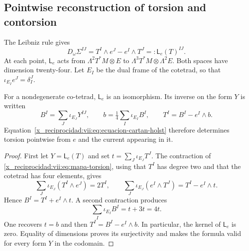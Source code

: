 \begin{HMTCompactSection}
\section{Pointwise reconstruction of torsion and contorsion}
\label{x_reciprocidad:vii:subsec:reconstruccion-torsion}

The Leibniz rule gives
\begin{equation}
 D_\omega\Sigma^{IJ}
 =T^I\wedge e^J-e^I\wedge T^J
 =:\mathsf L_e(T)^{IJ}.
 \label{x_reciprocidad:vii:eq:mapa-torsion}
\end{equation}
At each point, \(\mathsf L_e\) acts from \(\Lambda^2T^*M\otimes E\) to \(\Lambda^3T^*M\otimes\Lambda^2E\). Both spaces have dimension twenty-four. Let \(E_I\) be the dual frame of the cotetrad, so that \(\iota_{E_I}e^J=\delta_I^J\).

\begin{theorem}
\label{x_reciprocidad:vii:thm:inversion-torsion}
For a nondegenerate co-tetrad, \(\mathsf L_e\) is an isomorphism.
Its inverse on the form \(Y\) is written
\begin{equation}
 B^I=\sum_J\iota_{E_J}Y^{IJ},\qquad
 b=\tfrac14\sum_I\iota_{E_I}B^I,\qquad
 T^I=B^I-e^I\wedge b.
 \label{x_reciprocidad:vii:eq:torsion-explicita}
\end{equation}
Equation~\eqref{x_reciprocidad:vii:eq:ecuacion-cartan-holst} therefore determines
torsion pointwise from \(e\) and the current appearing in it.
\end{theorem}
\begin{proof}
First let \(Y=\mathsf L_e(T)\) and set \(t=\sum_J\iota_{E_J}T^J\). The contraction of \eqref{x_reciprocidad:vii:eq:mapa-torsion}, using that \(T^I\) has degree two and that the cotetrad has four elements, gives
\[
 \sum_J\iota_{E_J}(T^I\wedge e^J)=2T^I,
 \qquad
 \sum_J\iota_{E_J}(e^I\wedge T^J)=T^I-e^I\wedge t.
\]
Hence \(B^I=T^I+e^I\wedge t\). A second contraction produces
\[
 \sum_I\iota_{E_I}B^I=t+3t=4t.
\]
One recovers \(t=b\) and then \(T^I=B^I-e^I\wedge b\). In particular, the kernel of \(\mathsf L_e\) is zero. Equality of dimensions proves its surjectivity and makes the formula valid for every form \(Y\) in the codomain.
\end{proof}


\end{HMTCompactSection}
